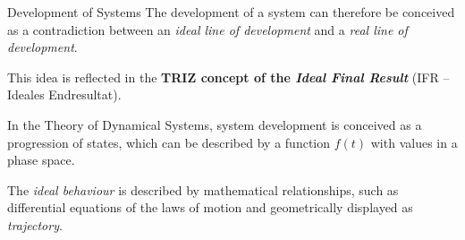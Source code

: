\documentclass{beamer}
\begin{document}

\begin{frame}{Development of Systems}
  The development of a system can therefore be conceived as a contradiction
  between an \emph{ideal line of development} and a \emph{real line of
    development}.

This idea is reflected in the \textbf{TRIZ concept of the \emph{Ideal Final
    Result}} (IFR -- Ideales Endresultat).

In the Theory of Dynamical Systems, system development is conceived as a
progression of states, which can be described by a function $f(t)$ with values
in a phase space.

The \emph{ideal behaviour} is described by mathematical relationships, such as
differential equations of the laws of motion and geometrically displayed as
\emph{trajectory}. 

\end{frame}
\end{document}
